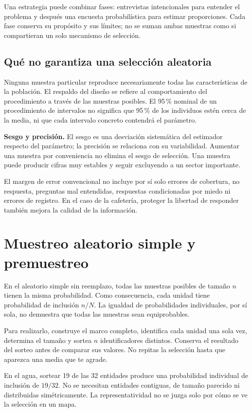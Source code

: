\documentclass[11pt,letterpaper]{article}
\begin{document}
Una estrategia puede combinar fases: entrevistas intencionales para entender el problema y después una encuesta probabilística para estimar proporciones. Cada fase conserva su propósito y sus límites; no se suman ambas muestras como si compartieran un solo mecanismo de selección.
\subsection{Qué no garantiza una selección aleatoria}
Ninguna muestra particular reproduce necesariamente todas las características de la población. El respaldo del diseño se refiere al comportamiento del procedimiento a través de las muestras posibles. El 95\,\% nominal de un procedimiento de intervalos no significa que 95\,\% de los individuos estén cerca de la media, ni que cada intervalo concreto contendrá el parámetro.

\textbf{Sesgo y precisión.} El sesgo es una desviación sistemática del estimador respecto del parámetro; la precisión se relaciona con su variabilidad. Aumentar una muestra por conveniencia no elimina el sesgo de selección. Una muestra puede producir cifras muy estables y seguir excluyendo a un sector importante.

El margen de error convencional no incluye por sí solo errores de cobertura, no respuesta, preguntas mal entendidas, respuestas condicionadas por miedo ni errores de registro. En el caso de la cafetería, proteger la libertad de responder también mejora la calidad de la información.
\clearpage
\section{Muestreo aleatorio simple y premuestreo}
En el aleatorio simple sin reemplazo, todas las muestras posibles de tamaño $n$ tienen la misma probabilidad. Como consecuencia, cada unidad tiene probabilidad de inclusión $n/N$. La igualdad de probabilidades individuales, por sí sola, no demuestra que todas las muestras sean equiprobables.

Para realizarlo, construye el marco completo, identifica cada unidad una sola vez, determina el tamaño y sortea $n$ identificadores distintos. Conserva el resultado del sorteo antes de comparar sus valores. No repitas la selección hasta que aparezca una media que te agrade.

En el agua, sortear 19 de las 32 entidades produce una probabilidad individual de inclusión de $19/32$. No se necesitan entidades contiguas, de tamaño parecido ni distribuidas simétricamente. La representatividad no se juzga solo por cómo se ve la selección en un mapa.
\end{document}
